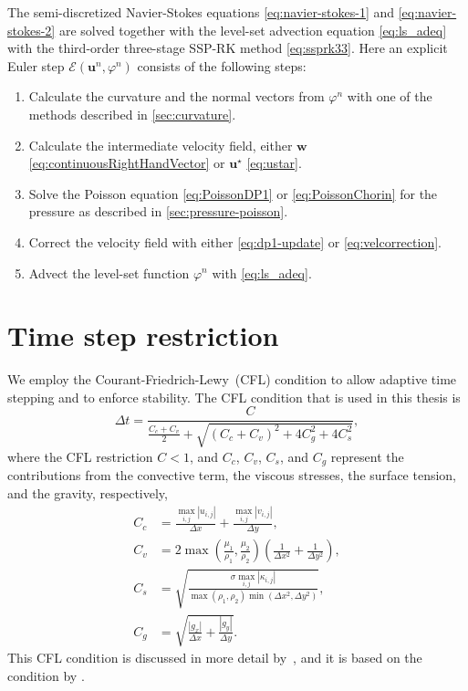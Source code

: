 \documentclass[11pt,b5paper,DIV=calc,BCOR1.3cm,headings=small,%
               footinclude=false,headsepline]{scrbook}
\newcommand*{\vct}[1]{\ensuremath{\boldsymbol{#1}}}
\begin{document}
The semi-discretized Navier-Stokes equations \eqref{eq:navier-stokes-1} and
\eqref{eq:navier-stokes-2} are solved together with the level-set advection
equation \eqref{eq:ls_adeq} with the third-order three-stage SSP-RK method
\eqref{eq:ssprk33}.  Here an explicit Euler step $\mathcal E(\vct
u^n,\varphi^n)$ consists of the following steps:
\begin{enumerate}
  \item Calculate the curvature and the normal vectors from $\varphi^n$ with
    one of the methods described in \cref{sec:curvature}.
  \item Calculate the intermediate velocity field, either $\vct w$
    \eqref{eq:continuousRightHandVector} or $\vct u^\star$ \eqref{eq:ustar}.
  \item Solve the Poisson equation \eqref{eq:PoissonDP1} or
    \eqref{eq:PoissonChorin} for the pressure as described in
    \cref{sec:pressure-poisson}.
  \item Correct the velocity field with either \eqref{eq:dp1-update} or
    \eqref{eq:velcorrection}.
  \item Advect the level-set function $\varphi^n$ with \eqref{eq:ls_adeq}.
\end{enumerate}

\section{Time step restriction}
\label{sec:deltaT}
We employ the Courant-Friedrich-Lewy~(CFL) condition to allow adaptive time
stepping and to enforce stability.  The CFL condition that is used in this
thesis is
\begin{equation}
  \Delta t = \frac{C}{\frac{C_c + C_v} 2
             + \sqrt{(C_c + C_v)^2 + 4C_g^2 + 4C_s^2}},
\end{equation}
where the CFL restriction $C<1$, and $C_c$, $C_v$, $C_s$, and $C_g$ represent
the contributions from the convective term, the viscous stresses, the surface
tension, and the gravity, respectively,
\begin{align}
  C_c &=  \frac{\max_{i,j}|u_{i,j}|}{\Delta x}
        + \frac{\max_{i,j}|v_{i,j}|}{\Delta y}, \\
  C_v &= 2\max\left(\frac{\mu_1}{\rho_1},\frac{\mu_2}{\rho_2}\right)
         \left(\frac{1}{\Delta x^2} + \frac{1}{\Delta y^2}\right), \\
  C_s &= \sqrt{\frac{\sigma\max_{i,j}|\kappa_{i,j}|}
                    {\max(\rho_1,\rho_2)\min(\Delta x^2,\Delta y^2)}}, \\
  C_g &= \sqrt{\frac{|g_x|}{\Delta x} + \frac{|g_y|}{\Delta y}}.
\end{align}
This CFL condition is discussed in more detail by~\citet{Lervag08}, and it is
based on the condition by \citet{Kang00}.
\end{document}
